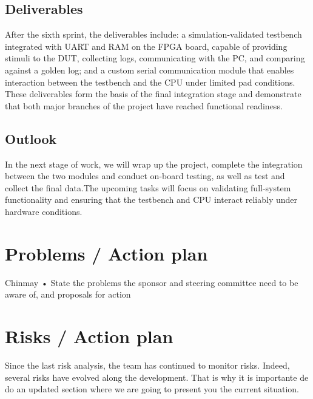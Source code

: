 \documentclass[10pt]{article}
\begin{document}
\subsection{Deliverables}
After the sixth sprint, the deliverables include: a simulation-validated testbench integrated with UART and RAM on the FPGA board, capable of providing stimuli to the DUT, collecting logs, communicating with the PC, and comparing against a golden log; and a custom serial communication module that enables interaction between the testbench and the CPU under limited pad conditions. These deliverables form the basis of the final integration stage and demonstrate that both major branches of the project have reached functional readiness.

\subsection{Outlook}
In the next stage of work, we will wrap up the project, complete the integration between the two modules and conduct on-board testing, as well as test and collect the final data.The upcoming tasks will focus on validating full-system functionality and ensuring that the testbench and CPU interact reliably under hardware conditions.



\section{Problems / Action plan}
Chinmay
• State the problems the sponsor and steering committee need to be aware of, and
proposals for action

\newpage
\section{Risks / Action plan}
Since the last risk analysis, the team has continued to monitor risks. Indeed, several risks have evolved along the development. That is why it is importante de do an updated section where we are going to present you the current situation.
\end{document}
